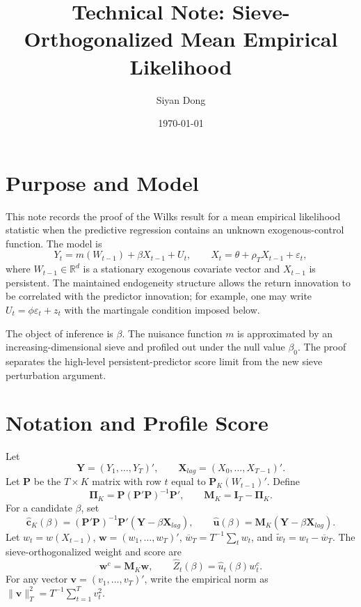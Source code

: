 \documentclass[11pt]{article}
\title{Technical Note: Sieve-Orthogonalized Mean Empirical Likelihood}
\author{Siyan Dong}
\date{\today}
\begin{document}
\maketitle

\section{Purpose and Model}

This note records the proof of the Wilks result for a mean empirical likelihood statistic when the predictive regression contains an unknown exogenous-control function. The model is
\begin{equation}
    Y_t=m(W_{t-1})+\beta X_{t-1}+U_t,
    \qquad
    X_t=\theta+\rho_T X_{t-1}+\varepsilon_t,
    \label{eq:tn-dgp}
\end{equation}
where \(W_{t-1}\in\mathbb R^d\) is a stationary exogenous covariate vector and \(X_{t-1}\) is persistent. The maintained endogeneity structure allows the return innovation to be correlated with the predictor innovation; for example, one may write \(U_t=\phi\varepsilon_t+z_t\) with the martingale condition imposed below.

The object of inference is \(\beta\). The nuisance function \(m\) is approximated by an increasing-dimensional sieve and profiled out under the null value \(\beta_0\). The proof separates the high-level persistent-predictor score limit from the new sieve perturbation argument.

\section{Notation and Profile Score}

Let
\[
    \bm Y=(Y_1,\ldots,Y_T)',\qquad
    \bm X_{lag}=(X_0,\ldots,X_{T-1})'.
\]
Let \(\bm P\) be the \(T\times K\) matrix with row \(t\) equal to \(\bm P_K(W_{t-1})'\). Define
\[
    \bm\Pi_K=\bm P(\bm P'\bm P)^{-1}\bm P',
    \qquad
    \bm M_K=\bm I_T-\bm\Pi_K.
\]
For a candidate \(\beta\), set
\begin{equation}
    \widehat{\bm c}_K(\beta)
      =(\bm P'\bm P)^{-1}\bm P'(\bm Y-\beta\bm X_{lag}),
    \qquad
    \widehat{\bm u}(\beta)=\bm M_K(\bm Y-\beta\bm X_{lag}).
    \label{eq:tn-profile}
\end{equation}
Let \(w_t=w(X_{t-1})\), \(\bm w=(w_1,\ldots,w_T)'\), \(\overline w_T=T^{-1}\sum_t w_t\), and \(\widetilde w_t=w_t-\overline w_T\). The sieve-orthogonalized weight and score are
\begin{equation}
    \bm w^c=\bm M_K\bm w,
    \qquad
    \widehat Z_t(\beta)=\widehat u_t(\beta)w_t^c.
    \label{eq:tn-score}
\end{equation}
For any vector \(\bm v=(v_1,\ldots,v_T)'\), write the empirical norm as \(\|\bm v\|_T^2=T^{-1}\sum_{t=1}^T v_t^2\).
\end{document}
